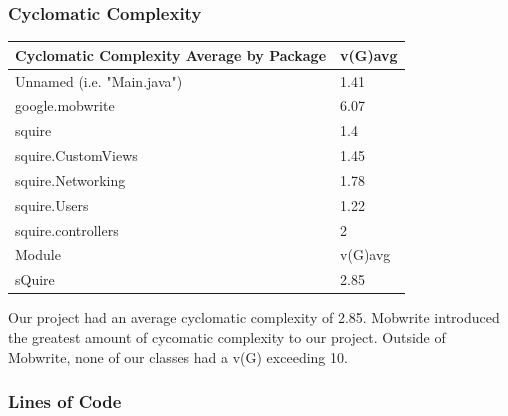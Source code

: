 \documentclass[twoside,letterpaper]{article}
\begin{document}
\subsubsection{ Cyclomatic Complexity	}
\begin{flushleft}

\begin{tabular}{|l|l|}
\hline
Cyclomatic Complexity Average by Package & v(G)avg \\ \hline
Unnamed (i.e. "Main.java")               & 1.41    \\ \hline
google.mobwrite                          & 6.07    \\ \hline
squire                                   & 1.4     \\ \hline
squire.CustomViews                       & 1.45    \\ \hline
squire.Networking                        & 1.78    \\ \hline
squire.Users                             & 1.22    \\ \hline
squire.controllers                       & 2       \\ \hline
Module                                   & v(G)avg \\ \hline
sQuire                                   & 2.85    \\ \hline
\end{tabular}
\end{flushleft}
\noindent	Our project had an average cyclomatic complexity of 2.85. Mobwrite introduced the greatest amount of cycomatic complexity to our project. Outside of Mobwrite, none of our classes had a v(G) exceeding 10.
	
	
\subsubsection{Lines of Code}
\end{document}

